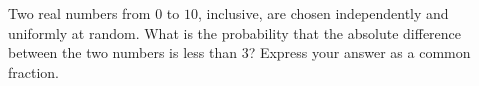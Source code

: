 Two real numbers from $0$ to $10$, inclusive, are chosen independently and uniformly at random. What is the probability that the absolute difference between the two numbers is less than $3$? Express your answer as a common fraction.
